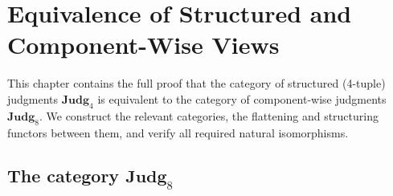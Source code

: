 
\chapter{Equivalence of Structured and Component-Wise Views}
\label{ch:proof-equiv}

This chapter contains the full proof that the category of structured
(4-tuple) judgments $\mathbf{Judg}_4$ is equivalent to the category of
component-wise judgments $\mathbf{Judg}_8$.  We construct the relevant
categories, the flattening and structuring functors between them, and
verify all required natural isomorphisms.

\section{The category $\mathbf{Judg}_8$}
\label{sec:judg8}


